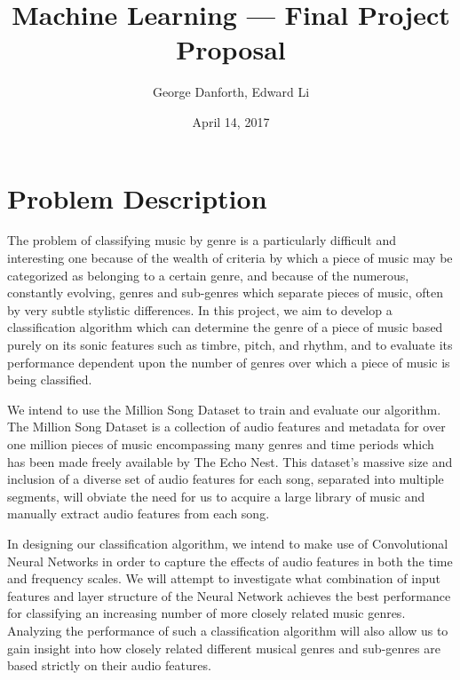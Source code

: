 \documentclass[11pt]{article}
\title{Machine Learning --- Final Project Proposal}
\author{George Danforth, Edward Li}
\date{April 14, 2017}
\begin{document}
\maketitle

\section*{Problem Description}
The problem of classifying music by genre is a particularly difficult and interesting one because of the wealth of criteria by which a piece of music may be categorized as belonging to a certain genre, and because of the numerous, constantly evolving, genres and sub-genres which separate pieces of music, often by very subtle stylistic differences. In this project, we aim to develop a classification algorithm which can determine the genre of a piece of music based purely on its sonic features such as timbre, pitch, and rhythm, and to evaluate its performance dependent upon the number of genres over which a piece of music is being classified.
\par We intend to use the Million Song Dataset to train and evaluate our algorithm. The Million Song Dataset is a collection of audio features and metadata for over one million pieces of music encompassing many genres and time periods which has been made freely available by The Echo Nest. This dataset's massive size and inclusion of a diverse set of audio features for each song, separated into multiple segments, will obviate the need for us to acquire a large library of music and manually extract audio features from each song.
\par In designing our classification algorithm, we intend to make use of Convolutional Neural Networks in order to capture the effects of audio features in both the time and frequency scales. We will attempt to investigate what combination of input features and layer structure of the Neural Network achieves the best performance for classifying an increasing number of more closely related music genres. Analyzing the performance of such a classification algorithm will also allow us to gain insight into how closely related different musical genres and sub-genres are based strictly on their audio features.
\end{document}
